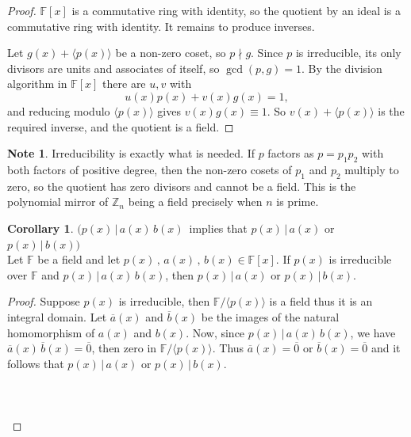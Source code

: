 \documentclass[11pt,a4paper]{article}
\theoremstyle{definition}
\newtheorem{coro}[thm]{Corollary}
\newtheorem*{note}{Note}
\begin{document}
\begin{proof}
$\mathbb{F}[x]$ is a commutative ring with identity, so the quotient by an ideal
is a commutative ring with identity. It remains to produce inverses.

Let $g(x) + \langle p(x)\rangle$ be a non-zero coset, so $p \nmid g$. Since $p$
is irreducible, its only divisors are units and associates of itself, so
$\gcd(p,g) = 1$. By the division algorithm in $\mathbb{F}[x]$ there are $u,v$
with
$$u(x)p(x) + v(x)g(x) = 1 ,$$
and reducing modulo $\langle p(x)\rangle$ gives
$v(x)g(x) \equiv 1$. So $v(x)+\langle p(x)\rangle$ is the required inverse, and
the quotient is a field.
\end{proof}

\begin{note}
Irreducibility is exactly what is needed. If $p$ factors as $p = p_1p_2$ with
both factors of positive degree, then the non-zero cosets of $p_1$ and $p_2$
multiply to zero, so the quotient has zero divisors and cannot be a field. This
is the polynomial mirror of $\mathbb{Z}_n$ being a field precisely when $n$ is
prime.
\end{note}




\begin{coro}
$\Big(p(x)\, |\, a(x)\, b(x)\, $ implies that $p(x)\, |\, a(x)$ or $p(x)\, |\, b(x)\Big)$\\
Let $\mathbb{F}$ be a field and let $p(x)\, , \, a(x)\, , \, b(x)\in \mathbb{F}[x]$. If $p(x)$ is irreducible over $\mathbb{F}$ and $p(x)\, |\, a(x)\, b(x)$, then $p(x)\, |\, a(x)$ or $p(x)\, | \, b(x)$.\\
\end{coro}

\begin{proof}
Suppose $p(x)$ is irreducible, then $\mathbb{F}/\langle p(x)\rangle$ is a field thus it is an integral domain. Let $\overline{a}(x)$ and $\overline{b}(x)$ be the images of the natural homomorphism of $a(x)$ and $b(x)$. Now, since $p(x)\, |\, a(x)\, b(x)$, we have $\overline{a}(x)\, \overline{b}(x) = \overline{0}$, then zero in $\mathbb{F}/\langle p(x) \rangle$. Thus $\overline{a}(x) = \overline{0}$ or $\overline{b}(x) = \overline{0}$ and it follows that $p(x)\, |\, a(x)$ or $p(x)\, |\, b(x)$.\\\\\\\\
\end{proof}
\end{document}
